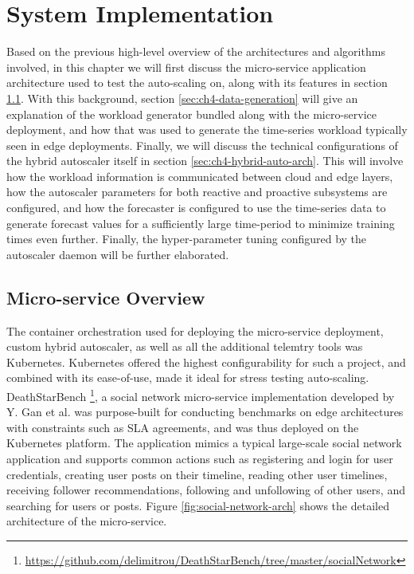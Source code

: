 \clearpage

\def\chaptertitle{System Implementation}

\lhead{\emph{\chaptertitle}}

\chapter{\chaptertitle}
\label{ch:experimental-setup}

Based on the previous high-level overview of the architectures and algorithms involved, in this chapter we will first discuss the micro-service application architecture used to test the auto-scaling on, along with its features in section \ref{sec:ch4-microservice-overview}. With this background, section \ref{sec:ch4-data-generation} will give an explanation of the workload generator bundled along with the micro-service deployment, and how that was used to generate the time-series workload typically seen in edge deployments. Finally, we will discuss the technical configurations of the hybrid autoscaler itself in section \ref{sec:ch4-hybrid-auto-arch}. This will involve how the workload information is communicated between cloud and edge layers, how the autoscaler parameters for both reactive and proactive subsystems are configured, and how the forecaster is configured to use the time-series data to generate forecast values for a sufficiently large time-period to minimize training times even further. Finally, the hyper-parameter tuning configured by the autoscaler daemon will be further elaborated.

\section{Micro-service Overview}
\label{sec:ch4-microservice-overview}

The container orchestration used for deploying the micro-service deployment, custom hybrid autoscaler, as well as all the additional telemtry tools was Kubernetes. Kubernetes offered the highest configurability for such a project, and combined with its ease-of-use, made it ideal for stress testing auto-scaling. DeathStarBench \footnote{\url{https://github.com/delimitrou/DeathStarBench/tree/master/socialNetwork}}, a social network micro-service implementation developed by Y. Gan et al. \cite{gan2019open} was purpose-built for conducting benchmarks on edge architectures with constraints such as SLA agreements, and was thus deployed on the Kubernetes platform. The application mimics a typical large-scale social network application and supports common actions such as registering and login for user credentials, creating user posts on their timeline, reading other user timelines, receiving follower recommendations, following and unfollowing of other users, and searching for users or posts. Figure \ref{fig:social-network-arch} shows the detailed architecture of the micro-service.\par

